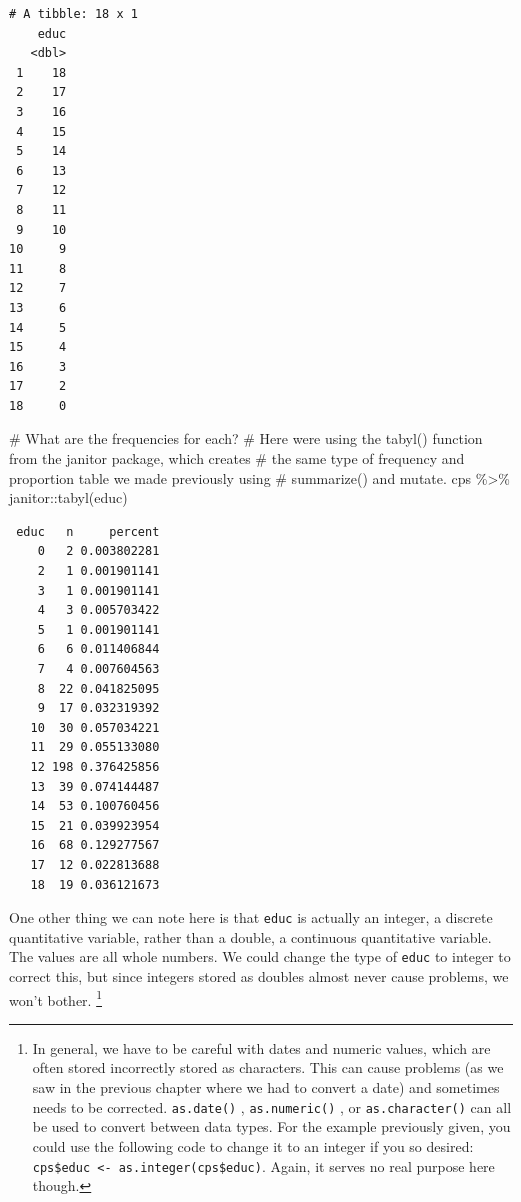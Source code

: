 \documentclass[
  letterpaper,
]{book}
\newenvironment{Shaded}{\begin{snugshade}}{\end{snugshade}}
\newcommand{\CommentTok}[1]{\textcolor[rgb]{0.37,0.37,0.37}{#1}}
\newcommand{\FunctionTok}[1]{\textcolor[rgb]{0.28,0.35,0.67}{#1}}
\newcommand{\NormalTok}[1]{\textcolor[rgb]{0.00,0.23,0.31}{#1}}
\newcommand{\SpecialCharTok}[1]{\textcolor[rgb]{0.37,0.37,0.37}{#1}}
\begin{document}
\begin{verbatim}
# A tibble: 18 x 1
    educ
   <dbl>
 1    18
 2    17
 3    16
 4    15
 5    14
 6    13
 7    12
 8    11
 9    10
10     9
11     8
12     7
13     6
14     5
15     4
16     3
17     2
18     0
\end{verbatim}

\begin{Shaded}
\begin{Highlighting}[]
\CommentTok{\# What are the frequencies for each?}
\CommentTok{\# Here we\textquotesingle{}re using the tabyl() function from the janitor package, which creates}
\CommentTok{\# the same type of frequency and proportion table we made previously using }
\CommentTok{\# summarize() and mutate.}
\NormalTok{cps }\SpecialCharTok{\%\textgreater{}\%} 
\NormalTok{  janitor}\SpecialCharTok{::}\FunctionTok{tabyl}\NormalTok{(educ)}
\end{Highlighting}
\end{Shaded}

\begin{verbatim}
 educ   n     percent
    0   2 0.003802281
    2   1 0.001901141
    3   1 0.001901141
    4   3 0.005703422
    5   1 0.001901141
    6   6 0.011406844
    7   4 0.007604563
    8  22 0.041825095
    9  17 0.032319392
   10  30 0.057034221
   11  29 0.055133080
   12 198 0.376425856
   13  39 0.074144487
   14  53 0.100760456
   15  21 0.039923954
   16  68 0.129277567
   17  12 0.022813688
   18  19 0.036121673
\end{verbatim}

One other thing we can note here is that \texttt{educ} is actually an
integer, a discrete quantitative variable, rather than a double, a
continuous quantitative variable. The values are all whole numbers. We
could change the type of \texttt{educ} to integer to correct this, but
since integers stored as doubles almost never cause problems, we won't
bother. \footnote{In general, we have to be careful with dates and
  numeric values, which are often stored incorrectly stored as
  characters. This can cause problems (as we saw in the previous chapter
  where we had to convert a date) and sometimes needs to be corrected.
  \texttt{as.date()} , \texttt{as.numeric()} , or
  \texttt{as.character()} can all be used to convert between data types.
  For the example previously given, you could use the following code to
  change it to an integer if you so desired:
  \texttt{cps\$educ\ \textless{}-\ as.integer(cps\$educ)}. Again, it
  serves no real purpose here though.}
\end{document}
